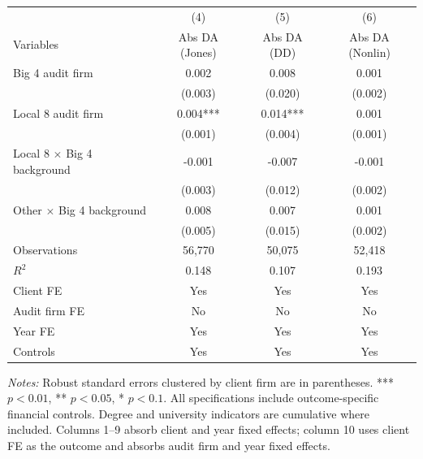 \documentclass[10pt]{article}
\begin{document}
\begin{minipage}{19cm}\fontsize{10}{12}\selectfont\setlength{\tabcolsep}{4pt}\renewcommand{\arraystretch}{1.12}


\centering
{}
\begin{threeparttable}
\begin{tabular}{p{}ccc}
\toprule
 & (4) & (5) & (6) \\
Variables & Abs DA (Jones) & Abs DA (DD) & Abs DA (Nonlin) \\
\midrule
Big 4 audit firm & 0.002 & 0.008 & 0.001 \\
 & (0.003) & (0.020) & (0.002) \\
Local 8 audit firm & 0.004*** & 0.014*** & 0.001 \\
 & (0.001) & (0.004) & (0.001) \\
Local 8 $\times$ Big 4 background & -0.001 & -0.007 & -0.001 \\
 & (0.003) & (0.012) & (0.002) \\
Other $\times$ Big 4 background & 0.008 & 0.007 & 0.001 \\
 & (0.005) & (0.015) & (0.002) \\
Observations & 56,770 & 50,075 & 52,418 \\
$R^{2}$ & 0.148 & 0.107 & 0.193 \\
Client FE & Yes & Yes & Yes \\
Audit firm FE & No & No & No \\
Year FE & Yes & Yes & Yes \\
Controls & Yes & Yes & Yes \\
\bottomrule
\end{tabular}
\begin{tablenotes}\fontsize{9}{11}\selectfont
\item \raggedright \fontsize{9}{11}\selectfont \textit{Notes:} Robust standard errors clustered by client firm are in parentheses. *** $p<0.01$, ** $p<0.05$, * $p<0.1$. All specifications include outcome-specific financial controls. Degree and university indicators are cumulative where included.
Columns 1--9 absorb client and year fixed effects; column 10 uses client FE as the outcome and absorbs audit firm and year fixed effects.
\end{tablenotes}
\end{threeparttable}

\end{minipage}
\end{document}
